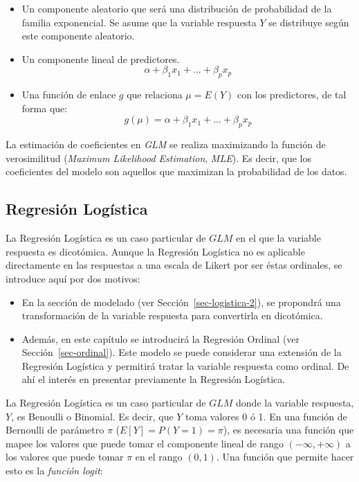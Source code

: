 \documentclass[
  12pt,
  a4paper,
  extrafontsizes,
  onecolumn,
  openright,
  table]{memoir}
\providecommand{\tightlist}{%
  \setlength{\itemsep}{0pt}\setlength{\parskip}{0pt}}\usepackage{longtable,booktabs,array}
\begin{document}
\begin{itemize}
\item
  Un componente aleatorio que será una distribución de probabilidad de
  la familia exponencial. Se asume que la variable respuesta \(Y\) se
  distribuye según este componente aleatorio.
\item
  Un componente lineal de predictores. \[
  \alpha+\beta_1x_1+...+\beta_px_p
  \]
\item
  Una función de enlace \(g\) que relaciona \(\mu=E(Y)\) con los
  predictores, de tal forma que: \[
  g(\mu)=\alpha+\beta_1x_1+...+\beta_px_p
  \]
\end{itemize}

La estimación de coeficientes en \emph{GLM} se realiza maximizando la
función de verosimilitud (\emph{Maximum Likelihood Estimation},
\emph{\gls{MLE}}). Es decir, que los coeficientes del modelo son
aquellos que maximizan la probabilidad de los datos.

\hypertarget{sec-logistica}{%
\subsection{Regresión Logística}\label{sec-logistica}}

La \gls{Regresión Logística} es un caso particular de \(GLM\) en el que
la variable respuesta es dicotómica. Aunque la Regresión Logística no es
aplicable directamente en las respuestas a una escala de Likert por ser
éstas ordinales, se introduce aquí por dos motivos:

\begin{itemize}
\tightlist
\item
  En la sección de modelado (ver Sección~\ref{sec-logistica-2}), se
  propondrá una transformación de la variable respuesta para convertirla
  en dicotómica.
\item
  Además, en este capítulo se introducirá la Regresión Ordinal (ver
  Sección~\ref{sec-ordinal}). Este modelo se puede considerar una
  extensión de la Regresión Logística y permitirá tratar la variable
  respuesta como ordinal. De ahí el interés en presentar previamente la
  Regresión Logística.
\end{itemize}

La \gls{Regresión Logística} \autocite[ver][pp.~68-69]{agresti_2018} es
un caso particular de \(GLM\) donde la variable respuesta, \(Y\), es
Benoulli o Binomial. Es decir, que \(Y\) toma valores 0 ó 1. En una
función de Bernoulli de parámetro \(\pi\) (\(E[Y] = P(Y=1) = \pi\)), es
necesaria una función que mapee los valores que puede tomar el
componente lineal de rango \((-\infty, +\infty)\) a los valores que
puede tomar \(\pi\) en el rango \((0, 1)\). Una función que permite
hacer esto es la \emph{\gls{función logit}}:
\end{document}
